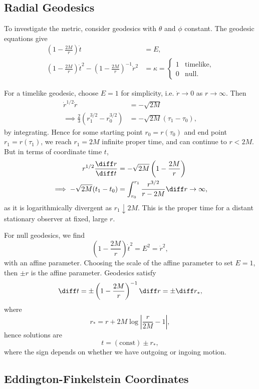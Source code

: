 \documentclass[12pt]{article}
\begin{document}
\subsection{Radial Geodesics}
\label{sub:rg}

To investigate the metric, consider geodesics with $\theta$ and $\phi$ constant. The geodesic equations give
\begin{align*}
	\left(1 - \frac{2M}{r} \right)\dot t &= E, \\
	\left(1 - \frac{2M}{r} \right) \dot t^2 - \left(1 - \frac{2M}{r} \right)^{-1} \dot r^2 &= \kappa =
	\begin{cases}
		1 & \text{timelike}, \\
		0 & \text{null}.
	\end{cases}
\end{align*}

For a timelike geodesic, choose $E = 1$ for simplicity, i.e. $\dot r \to 0$ as $r \to \infty$. Then
\begin{align*}
	\dot r^{1/2} \dot r &= - \sqrt{2M} \\
	\implies \frac{2}{3}(r_1^{3/2} - r_0^{3/2}) &= - \sqrt{2M} (\tau_1- \tau_0),
\end{align*}
by integrating. Hence for some starting point $r_0 = r(\tau_0)$ and end point $r_1 = r(\tau_1)$, we reach $r_1 = 2M$ infinite proper time, and can continue to $r < 2M$. But in terms of coordinate time $t$,
\begin{align*}
	r^{1/2} \frac{\diff r}{\diff t} &= - \sqrt{2M} \left(1 - \frac{2M}{r} \right) \\
	\implies - \sqrt{2M}(t_1 - t_0) &= \int_{r_0}^{r_1} \frac{r^{3/2}}{r - 2M} \diff r \to \infty,
\end{align*}
as it is logarithmically divergent as $r_1 \downarrow 2M$. This is the proper time for a distant stationary observer at fixed, large $r$.

For null geodesics, we find
\[
\left(1 - \frac{2M}{r} \right) \dot t^2 = E^2 = \dot r^2,
\]
with an affine parameter. Choosing the scale of the affine parameter to set $E = 1$, then $\pm r$ is the affine parameter. Geodesics satisfy
\[
\diff t = \pm \left(1 - \frac{2M}{r} \right)^{-1} \diff r = \pm \diff r_\ast,
\]
where
\[
r_\ast = r + 2M \log \left| \frac{r}{2M} - 1 \right|,
\]
hence solutions are
\[
	t = (\text{const}) \pm r_\ast,
\]
where the sign depends on whether we have outgoing or ingoing motion.

\subsection{Eddington-Finkelstein Coordinates}
\label{sub:efc}
\end{document}
